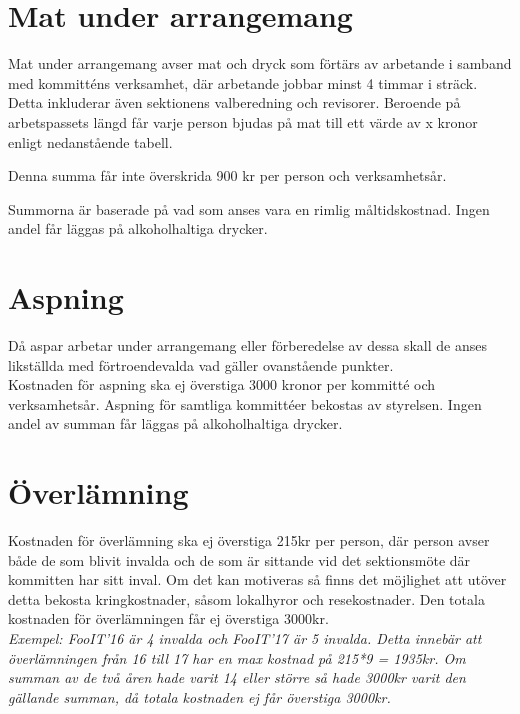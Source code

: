 \documentclass[11pt, includeaddress]{classes/cthit}
\begin{document}
\section{Mat under arrangemang}
Mat under arrangemang avser mat och dryck som förtärs av arbetande i samband med kommitténs verksamhet, där arbetande jobbar minst 4 timmar i sträck. Detta inkluderar även sektionens valberedning och revisorer. Beroende på arbetspassets längd får varje person bjudas på mat till ett värde av x kronor enligt nedanstående tabell.

\addvbuffer[\the\baselineskip]{\begin{tabular}{ l  c  c  c}
	\centering
	Timmar & [0-4] & (4-8] & (8-$\infty$) \\
	\hline
	Kronor & 0 & 45 & 90 \\
\end{tabular}}

    Denna summa får inte överskrida 900 kr per person och verksamhetsår.

    Summorna är baserade på vad som anses vara en rimlig
    måltidskostnad. Ingen andel får läggas på alkoholhaltiga drycker.

\section{Aspning}
Då aspar arbetar under arrangemang eller förberedelse av dessa skall de anses likställda med förtroendevalda vad gäller ovanstående punkter. \\

Kostnaden för aspning ska ej överstiga 3000 kronor per kommitté och verksamhetsår.
Aspning för samtliga kommittéer bekostas av styrelsen. Ingen andel av summan får läggas på alkoholhaltiga drycker.

\section{Överlämning}
Kostnaden för överlämning ska ej överstiga 215kr per person, där person avser både de som blivit invalda och de som är sittande vid det sektionsmöte där kommitten har sitt inval. Om det kan motiveras så ﬁnns det möjlighet att utöver detta bekosta kringkostnader, såsom lokalhyror och resekostnader. Den totala kostnaden för överlämningen får ej överstiga 3000kr.\\

\textit{Exempel: FooIT'16 är 4 invalda och FooIT'17 är 5 invalda. Detta innebär att överlämningen från 16 till 17 har en max kostnad på 215*9 = 1935kr. Om summan av de två åren hade varit 14 eller större så hade 3000kr varit den gällande summan, då totala kostnaden ej får överstiga 3000kr.}
\end{document}
